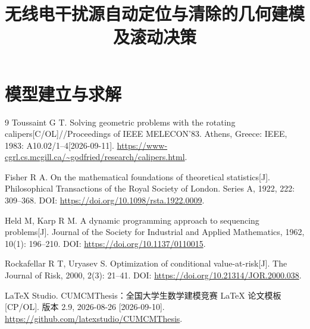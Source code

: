 \documentclass[withoutpreface,bwprint]{cumcmthesis}
\title{无线电干扰源自动定位与清除的几何建模及滚动决策}
\begin{document}
\maketitle









\section{模型建立与求解}











\begin{thebibliography}{9}
  Toussaint G T.
  \newblock Solving geometric problems with the rotating calipers[C/OL]//Proceedings of IEEE MELECON'83.
  \newblock Athens, Greece: IEEE, 1983: A10.02/1--4[2026-09-11].
  \newblock \url{https://www-cgrl.cs.mcgill.ca/~godfried/research/calipers.html}.

  Fisher R A.
  \newblock On the mathematical foundations of theoretical statistics[J].
  \newblock Philosophical Transactions of the Royal Society of London. Series A,
  1922, 222: 309--368. DOI: \url{https://doi.org/10.1098/rsta.1922.0009}.

  Held M, Karp R M.
  \newblock A dynamic programming approach to sequencing problems[J].
  \newblock Journal of the Society for Industrial and Applied Mathematics,
  1962, 10(1): 196--210. DOI: \url{https://doi.org/10.1137/0110015}.

  Rockafellar R T, Uryasev S.
  \newblock Optimization of conditional value-at-risk[J].
  \newblock The Journal of Risk, 2000, 2(3): 21--41.
  DOI: \url{https://doi.org/10.21314/JOR.2000.038}.

  LaTeX Studio.
  \newblock CUMCMThesis：全国大学生数学建模竞赛 \LaTeX{} 论文模板[CP/OL].
  \newblock 版本 2.9, 2026-08-26 [2026-09-10]. \url{https://github.com/latexstudio/CUMCMThesis}.

\end{thebibliography}

\clearpage
\begin{appendices}




\end{appendices}
\end{document}
